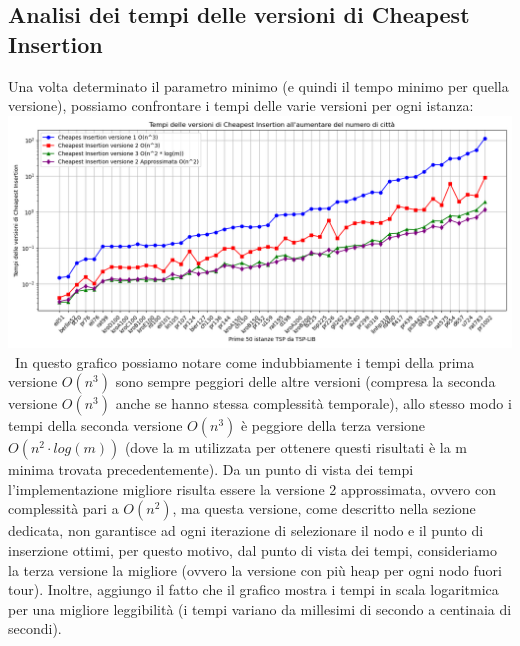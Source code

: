 \documentclass[a4paper,12pt]{report}
\begin{document}
\subsection{Analisi dei tempi delle versioni di Cheapest Insertion}
Una volta determinato il parametro minimo (e quindi il tempo minimo per quella versione), possiamo confrontare i tempi delle varie versioni per ogni istanza: \newline
\includegraphics[width=1\textwidth]{../Grafici/2.png} \
In questo grafico possiamo notare come indubbiamente i tempi della prima versione $O(n^3)$ sono sempre peggiori delle altre versioni (compresa la seconda versione $O(n^3)$ anche se hanno stessa complessità temporale), allo stesso modo i tempi della seconda versione $O(n^3)$ è peggiore della terza versione $O(n^2 \cdot log(m))$ (dove la m utilizzata per ottenere questi risultati è la m minima trovata precedentemente). Da un punto di vista dei tempi l'implementazione migliore risulta essere la versione 2 approssimata, ovvero con complessità pari a $O(n^2)$, ma questa versione, come descritto nella sezione dedicata, non garantisce ad ogni iterazione di selezionare il nodo e il punto di inserzione ottimi, per questo motivo, dal punto di vista dei tempi, consideriamo la terza versione la migliore (ovvero la versione con più heap per ogni nodo fuori tour). Inoltre, aggiungo il fatto che il grafico mostra i tempi in scala logaritmica per una migliore leggibilità (i tempi variano da millesimi di secondo a centinaia di secondi).
\end{document}
